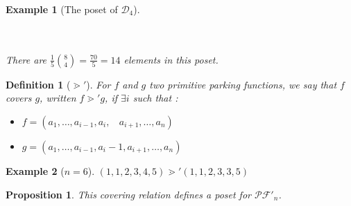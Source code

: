 \documentclass[12pt]{report}
\newtheorem*{prop}{Proposition}
\newtheorem{definition}{Definition}
\newtheorem*{example}{Example}
\begin{document}
\begin{example}[The poset of $\mathcal{D}_4$]
\begin{center}
\begin{tikzpicture}[scale = 0.3]
        \end{tikzpicture}
        ~\\
        ~\\
        There are $\frac {1}{5} \binom{8}{4} = \frac{70}{5} = 14$
        elements in this poset.
    \end{center}
\end{example}

\begin{definition}[$\gtrdot'$]
    For $f$ and $g$ two primitive parking functions, we say
    that $f$ covers $g$, written $f \gtrdot' g$, if
    $\exists i$ such that :
    \begin{itemize}
        \item $f = (a_1, \ldots, a_{i-1}, a_i,\ \ \ \ 
            a_{i+1}, \ldots, a_n)$
        \item $g = (a_1, \ldots, a_{i-1}, a_i - 1, a_{i+1},
        \ldots, a_n)$
    \end{itemize}
\end{definition}

\begin{example}[$n = 6$]
    $(1, 1, 2, 3, 4, 5) \gtrdot' (1, 1, 2, 3, 3, 5)$    
\end{example}

\begin{prop}
    This covering relation defines a \emph{poset}
    for $\mathcal{PF'}_n$.
\end{prop}
\end{document}
